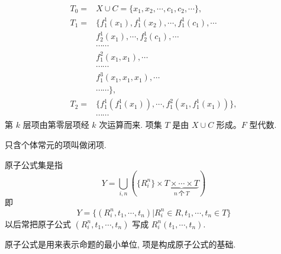\documentclass[
    mode=hazy,
    color=blue,
    device=normal,
    lang=cn
]{elegantnote}
\begin{document}
$$
    \begin{aligned}
        T_0 = & X\cup C=\{x_1, x_2, \cdots, c_1, c_2, \cdots\},        \\
        T_1 = & \{f_1^1(x_1), f_1^1(x_2), \cdots, f_1^1(c_1),\cdots    \\
              & f_2^1(x_1), \cdots, f_2^1(c_1), \cdots                 \\
              & \cdots\cdots                                           \\
              & f_1^2(x_1, x_1), \cdots                                \\
              & \cdots\cdots                                           \\
              & f_1^3(x_1, x_1, x_1), \cdots                           \\
              & \cdots\cdots\},                                        \\
        T_2 = & \{f_1^1(f_1^1(x_1)), \cdots, f_1^2(x_1, f_1^1(x_1))\}, \\
              & \cdots\cdots
    \end{aligned}
$$
第 $k$ 层项由第零层项经 $k$ 次运算而来. 项集 $T$ 是由 $X\cup C$ 形成。$F$ 型代数.
\begin{definition}[闭项]
    只含个体常元的项叫做闭项.
\end{definition}
\begin{definition}[原子公式集]
    原子公式集是指
    $$
        Y=\bigcup_{i,n} \left(\{R_i^n\}\times \underbrace{T\times\cdots\times T}_{n\ \text{个}\ T} \right)
    $$
    即
    $$
        Y=\{(R_i^n, t_1, \cdots, t_n)\vert R_i^n\in R, t_1, \cdots, t_n \in T\}
    $$
    以后常把原子公式 $(R_i^n, t_1, \cdots, t_n)$ 写成 $R_i^n(t_1, \cdots, t_n)$.
\end{definition}
原子公式是用来表示命题的最小单位, 项是构成原子公式的基础.
\end{document}
